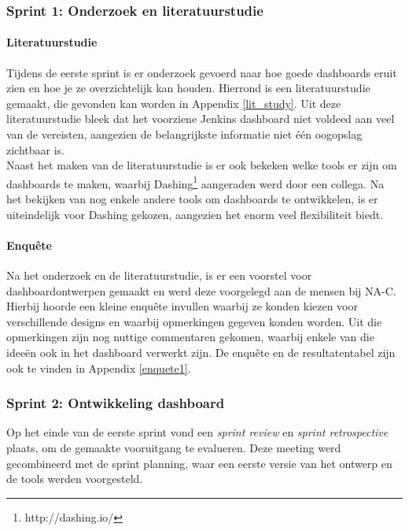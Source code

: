 \documentclass[10pt,a4paper]{article}
\begin{document}
\subsubsection{Sprint 1: Onderzoek en literatuurstudie} 
\label{sprint1}
\paragraph{Literatuurstudie} Tijdens de eerste sprint is er onderzoek gevoerd naar hoe goede dashboards eruit zien en hoe je ze overzichtelijk kan houden. Hierrond is een literatuurstudie gemaakt, die gevonden kan worden in Appendix \ref{lit_study}. Uit deze literatuurstudie bleek dat het voorziene Jenkins dashboard niet voldeed aan veel van de vereisten, aangezien de belangrijkste informatie niet \'e\'en oogopslag zichtbaar is.\\
Naast het maken van de literatuurstudie is er ook bekeken welke tools er zijn om dashboards te maken, waarbij Dashing\footnote{http://dashing.io/} aangeraden werd door een collega. Na het bekijken van nog enkele andere tools om dashboards te ontwikkelen, is er uiteindelijk voor Dashing gekozen, aangezien het enorm veel flexibiliteit biedt.
\paragraph{Enqu\^ete}
Na het onderzoek en de literatuurstudie, is er een voorstel voor dashboardontwerpen gemaakt en werd deze voorgelegd aan de mensen bij NA-C. Hierbij hoorde een kleine enqu\^ete invullen waarbij ze konden kiezen voor verschillende designs en waarbij opmerkingen gegeven konden worden. Uit die opmerkingen zijn nog nuttige commentaren gekomen, waarbij enkele van die idee\"en ook in het dashboard verwerkt zijn. De enqu\^ete en de resultatentabel zijn ook te vinden in Appendix \ref{enquete1}. 
\subsubsection{Sprint 2: Ontwikkeling dashboard} 
\label{sprint2}
Op het einde van de eerste sprint vond een \textit{sprint review} en \textit{sprint retrospective} plaats, om de gemaakte vooruitgang te evalueren. Deze meeting werd gecombineerd met de sprint planning, waar een eerste versie van het ontwerp en de tools werden voorgesteld.
\end{document}
